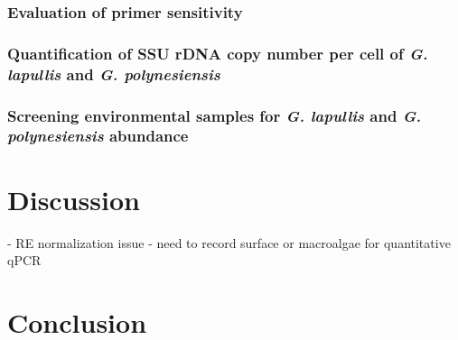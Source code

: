\documentclass[12pt]{article}
\begin{document}
\subsubsection{Evaluation of primer sensitivity}

\subsubsection{Quantification of SSU rDNA copy number per cell of \emph{G. lapullis} and \emph{G. polynesiensis}}

\subsubsection{Screening environmental samples for \emph{G. lapullis} and \emph{G. polynesiensis} abundance}

\section{Discussion}
- RE normalization issue
- need to record surface or macroalgae for quantitative qPCR
\section{Conclusion}

\FloatBarrier
\newpage


\end{document}
